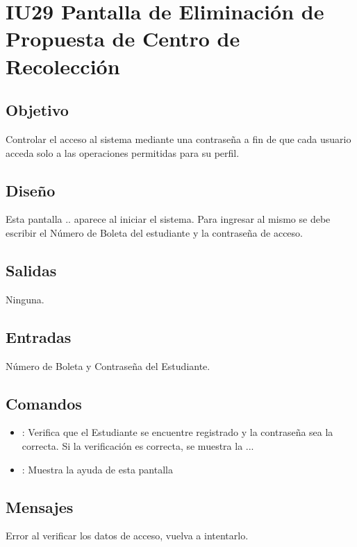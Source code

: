 \section{IU29 Pantalla de Eliminación de Propuesta de Centro de Recolección}

\subsection{Objetivo}
	Controlar el acceso al sistema mediante una contraseña a fin de que cada usuario acceda solo a las operaciones permitidas para su perfil.

\subsection{Diseño}
	Esta pantalla .. aparece al iniciar el sistema. Para ingresar al mismo se debe escribir el Número de Boleta del estudiante y la contraseña de acceso. 

\subsection{Salidas}

	Ninguna.

\subsection{Entradas}
Número de Boleta y Contraseña del Estudiante.

\subsection{Comandos}
\begin{itemize}
	\item {}: Verifica que el Estudiante se encuentre registrado y la contraseña sea la correcta. Si la verificación es correcta, se muestra la ...
	\item {}: Muestra la ayuda de esta pantalla %
\end{itemize}

\subsection{Mensajes}

\begin{Citemize}
	\item Error al verificar los datos de acceso, vuelva a intentarlo.
\end{Citemize}

\clearpage